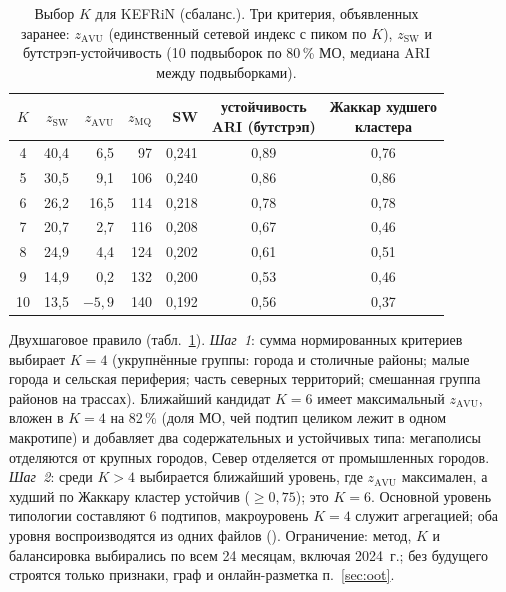 \documentclass[11pt,a4paper]{article}
\newcommand{\code}[1]{\path{#1}}
\begin{document}
\begin{table}[htbp]
\centering\small
\caption{Выбор $K$ для KEFRiN (сбаланс.). Три критерия, объявленных заранее: $z_{\mathrm{AVU}}$ (единственный сетевой индекс с пиком по $K$), $z_{\mathrm{SW}}$ и бутстрэп-устойчивость (10 подвыборок по 80\,\% МО, медиана ARI между подвыборками).}
\label{tab:k-select}
\begin{tabular}{crrrrcc}
\toprule
$K$ & $z_{\mathrm{SW}}$ & $z_{\mathrm{AVU}}$ & $z_{\mathrm{MQ}}$ & SW & \makecell{устойчивость\\ ARI (бутстрэп)} & \makecell{Жаккар худшего\\ кластера} \\
\midrule
4 & 40{,}4 & 6{,}5 & 97 & 0{,}241 & 0{,}89 & 0{,}76 \\
5 & 30{,}5 & 9{,}1 & 106 & 0{,}240 & 0{,}86 & 0{,}86 \\
6 & 26{,}2 & 16{,}5 & 114 & 0{,}218 & 0{,}78 & 0{,}78 \\
7 & 20{,}7 & 2{,}7 & 116 & 0{,}208 & 0{,}67 & 0{,}46 \\
8 & 24{,}9 & 4{,}4 & 124 & 0{,}202 & 0{,}61 & 0{,}51 \\
9 & 14{,}9 & 0{,}2 & 132 & 0{,}200 & 0{,}53 & 0{,}46 \\
10 & 13{,}5 & $-5{,}9$ & 140 & 0{,}192 & 0{,}56 & 0{,}37 \\
\bottomrule
\end{tabular}
\end{table}

Двухшаговое правило (табл.~\ref{tab:k-select}). \textit{Шаг~1}: сумма нормированных критериев выбирает $K=4$ (укрупнённые группы: города и столичные районы; малые города и сельская периферия; часть северных территорий; смешанная группа районов на трассах). Ближайший кандидат $K=6$ имеет максимальный $z_{\mathrm{AVU}}$, вложен в $K=4$ на 82\,\% (доля МО, чей подтип целиком лежит в одном макротипе) и добавляет два содержательных и устойчивых типа: мегаполисы отделяются от крупных городов, Север отделяется от промышленных городов. \textit{Шаг~2}: среди $K>4$ выбирается ближайший уровень, где $z_{\mathrm{AVU}}$ максимален, а худший по Жаккару кластер устойчив ($\ge 0{,}75$); это $K=6$. Основной уровень типологии составляют 6 подтипов, макроуровень $K=4$ служит агрегацией; оба уровня воспроизводятся из одних файлов (\code{outputs/compare/k_selection.csv}). Ограничение: метод, $K$ и балансировка выбирались по всем 24 месяцам, включая 2024~г.; без будущего строятся только признаки, граф и онлайн-разметка п.~\ref{sec:oot}.
\end{document}
